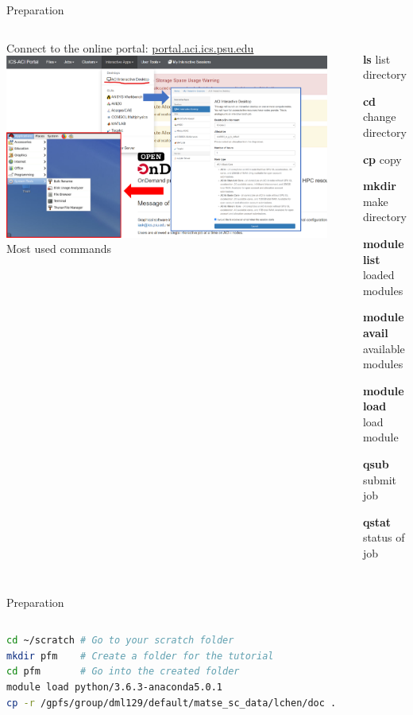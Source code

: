 \documentclass[11pt,aspectratio=169]{beamer}
\begin{document}
\begin{frame}[fragile]{Preparation}
\begin{columns}[t]
Connect to the online portal: \href{portal.aci.ics.psu.edu}{portal.aci.ics.psu.edu}
\includegraphics[width=0.9\linewidth]{img/interactive-allocation.png}
Most used commands\\
\begin{itemize}
    \item [{\bf ls}] list directory
    \item [{\bf cd}] change directory
    \item [{\bf cp}] copy
    \item [{\bf mkdir}] make directory
    \item [{\bf module list}] loaded modules
    \item [{\bf module avail}] available modules
    \item [{\bf module load}] load module
    \item [{\bf qsub }] submit job 
    \item [{\bf qstat }] status of job
\end{itemize}
\end{columns}

\end{frame}
\begin{frame}[fragile]{Preparation}
\begin{columns}
\begin{lstlisting}[language=bash]
cd ~/scratch # Go to your scratch folder
mkdir pfm    # Create a folder for the tutorial
cd pfm       # Go into the created folder
module load python/3.6.3-anaconda5.0.1
cp -r /gpfs/group/dml129/default/matse_sc_data/lchen/doc .
\end{lstlisting}
\end{columns}
\end{frame}
\end{document}
